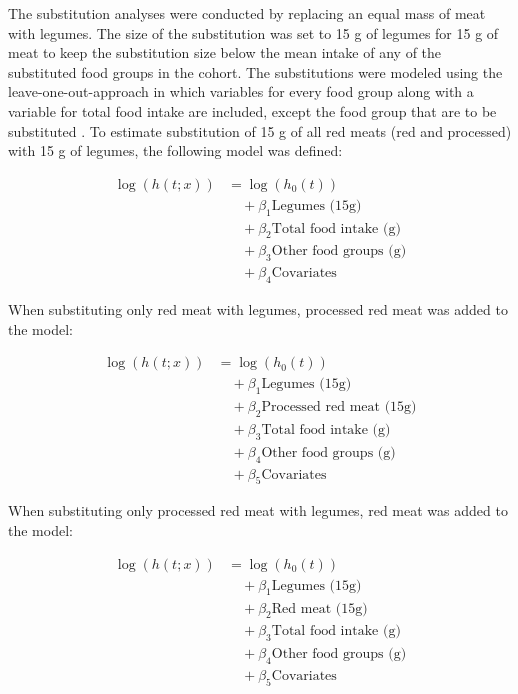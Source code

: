 \documentclass[sn-basic,Numbered,iicol,pdflatex]{sn-jnl}
\begin{document}
The substitution analyses were conducted by replacing an equal mass of
meat with legumes. The size of the substitution was set to 15 g of
legumes for 15 g of meat to keep the substitution size below the mean
intake of any of the substituted food groups in the cohort. The
substitutions were modeled using the leave-one-out-approach in which
variables for every food group along with a variable for total food
intake are included, except the food group that are to be substituted
\citep{Ibsen2021}. To estimate substitution of 15 g of all red meats (red and
processed) with 15 g of legumes, the following model was defined:

\begin{align}
\log(h(t;x)) &= \log(h_0(t)) \nonumber \\
&\quad + \beta_1 \text{Legumes (15g)} \nonumber \\
&\quad + \beta_2 \text{Total food intake (g)} \nonumber \\
&\quad + \beta_3 \text{Other food groups (g)} \nonumber \\
&\quad + \beta_4 \text{Covariates}
\end{align}

\noindent When substituting only red meat with legumes, processed red
meat was added to the model:

\begin{align}
\log(h(t;x)) &= \log(h_0(t)) \nonumber \\
&\quad + \beta_1 \text{Legumes (15g)} \nonumber \\
&\quad + \beta_2 \text{Processed red meat (15g)} \nonumber \\
&\quad + \beta_3 \text{Total food intake (g)} \nonumber \\
&\quad + \beta_4 \text{Other food groups (g)} \nonumber \\
&\quad + \beta_5 \text{Covariates}
\end{align}

\noindent When substituting only processed red meat with legumes, red
meat was added to the model:

\begin{align}
\log(h(t;x)) &= \log(h_0(t)) \nonumber \\
&\quad + \beta_1 \text{Legumes (15g)} \nonumber \\
&\quad + \beta_2 \text{Red meat (15g)} \nonumber \\
&\quad + \beta_3 \text{Total food intake (g)} \nonumber \\ 
&\quad + \beta_4 \text{Other food groups (g)} \nonumber \\
&\quad + \beta_5 \text{Covariates}
\end{align}
\end{document}
